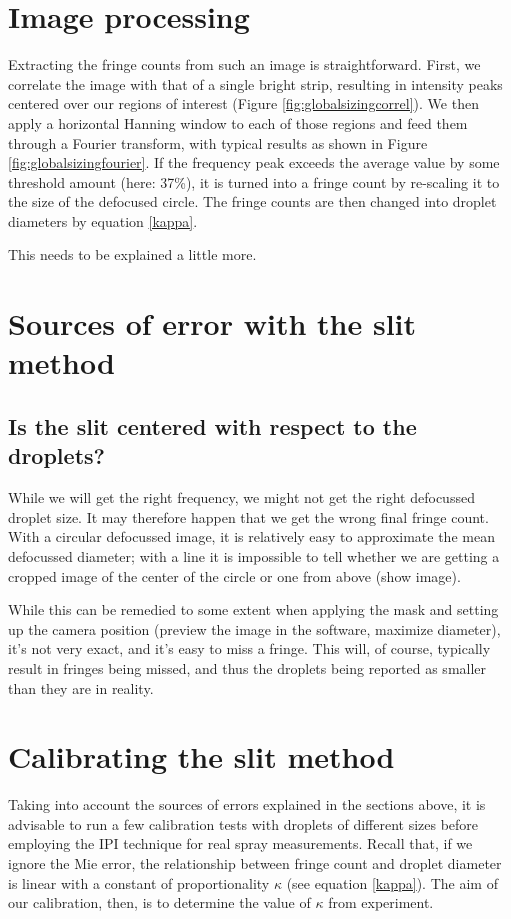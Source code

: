 \documentclass[10pt]{book}
\begin{document}
\section{Image processing}
Extracting the fringe counts from such an image is straightforward. First, we
correlate the image with that of a single bright strip, resulting in intensity
peaks centered over our regions of interest (Figure
\ref{fig:globalsizingcorrel}). We then apply a horizontal Hanning window to each
of those regions and feed them through a Fourier transform, with typical
results as shown in Figure \ref{fig:globalsizingfourier}. If the frequency peak
exceeds the average value by some threshold amount (here: 37\%), it is turned
into a fringe count by re-scaling it to the size of the defocused circle. The
fringe counts are then changed into droplet diameters by equation \eqref{kappa}.

This needs to be explained a little more.

\section{Sources of error with the slit method}
\subsection{Is the slit centered with respect to the droplets?}
While we will get the right frequency, we might not get the right defocussed
droplet size. It may therefore happen that we get the wrong final fringe count.
With a circular defocussed image, it is relatively easy to approximate the mean
defocussed diameter; with a line it is impossible to tell whether we are getting
a cropped image of the center of the circle or one from above (show image).

While this can be remedied to some extent when applying the mask and setting up
the camera position (preview the image in the software, maximize diameter), it's
not very exact, and it's easy to miss a fringe. This will, of course, typically
result in fringes being missed, and thus the droplets being reported as smaller
than they are in reality.

\section{Calibrating the slit method}
Taking into account the sources of errors explained in the sections above, it is
advisable to run a few calibration tests with droplets of different sizes before
employing the IPI technique for real spray measurements. Recall that, if we
ignore the Mie error, the relationship between fringe count and droplet diameter
is linear with a constant of proportionality $\kappa$ (see equation
\eqref{kappa}). The aim of our calibration, then, is to determine the value of
$\kappa$ from experiment.
\end{document}

